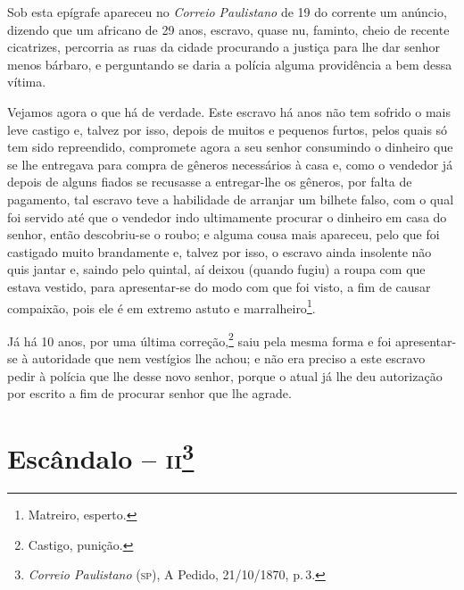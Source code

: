 Sob esta epígrafe apareceu no \emph{Correio Paulistano} de 19 do
corrente um anúncio, dizendo que um africano de 29 anos, escravo, quase
nu, faminto, cheio de recente cicatrizes, percorria as ruas da cidade
procurando a justiça para lhe dar senhor menos bárbaro, e perguntando se
daria a polícia alguma providência a bem dessa vítima.

Vejamos agora o que há de verdade. Este escravo há anos não tem sofrido
o mais leve castigo e, talvez por isso, depois de muitos e pequenos
furtos, pelos quais só tem sido repreendido, compromete agora a seu
senhor consumindo o dinheiro que se lhe entregava para compra de gêneros
necessários à casa e, como o vendedor já depois de alguns fiados se
recusasse a entregar-lhe os gêneros, por falta de pagamento, tal escravo
teve a habilidade de arranjar um bilhete falso, com o qual foi servido
até que o vendedor indo ultimamente procurar o dinheiro em casa do
senhor, então descobriu-se o roubo; e alguma cousa mais apareceu, pelo
que foi castigado muito brandamente e, talvez por isso, o escravo ainda
insolente não quis jantar e, saindo pelo quintal, aí deixou (quando
fugiu) a roupa com que estava vestido, para apresentar-se do modo com
que foi visto, a fim de causar compaixão, pois ele é em extremo astuto e
marralheiro\footnote{ Matreiro, esperto.}.

Já há 10 anos, por uma última correção,\footnote{ Castigo, punição.}
saiu pela mesma forma e foi apresentar-se à autoridade que nem vestígios
lhe achou; e não era preciso a este escravo pedir à polícia que lhe
desse novo senhor, porque o atual já lhe deu autorização por escrito a
fim de procurar senhor que lhe agrade.

\asterisc{}

\chapter{Escândalo -- \textsc{ii}\footnote{\emph{Correio Paulistano} (\textsc{sp}), A Pedido, 21/10/1870,
  p.\,3.}} %

